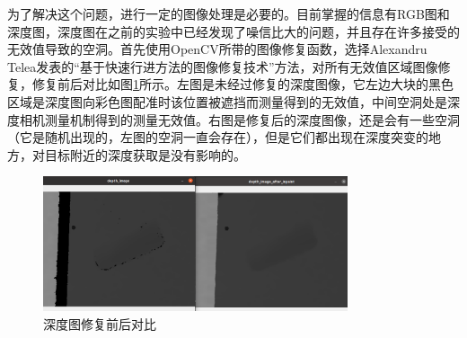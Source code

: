 \documentclass[fontset=fandol,type=bachelor,campus=harbin,bsmainpagenumberline=true]{hithesisbook}
\begin{document}
为了解决这个问题，进行一定的图像处理是必要的。目前掌握的信息有RGB图和深度图，深度图在之前的实验中已经发现了噪信比大的问题，并且存在许多接受的无效值导致的空洞。首先使用OpenCV所带的图像修复函数，选择Alexandru Telea发表的“基于快速行进方法的图像修复技术”方法\cite{telea2004image}，对所有无效值区域图像修复，修复前后对比如图\ref{深度图修复前后对比}所示。左图是未经过修复的深度图像，它左边大块的黑色区域是深度图向彩色图配准时该位置被遮挡而测量得到的无效值，中间空洞处是深度相机测量机制得到的测量无效值。右图是修复后的深度图像，还是会有一些空洞（它是随机出现的，左图的空洞一直会存在），但是它们都出现在深度突变的地方，对目标附近的深度获取是没有影响的。
\begin{figure}[h]
\centering
\includegraphics[width = 0.8\textwidth]{chapter4/深度图修复前后对比}
\caption{深度图修复前后对比}
\label{深度图修复前后对比}
\end{figure}
\end{document}
